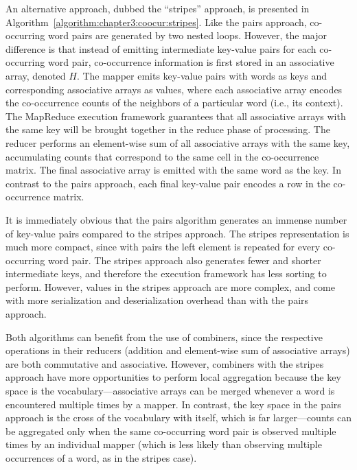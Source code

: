 \afterpage{\clearpage}

An alternative approach, dubbed the ``stripes'' approach, is presented
in Algorithm~\ref{algorithm:chapter3:coocur:stripes}.  Like the pairs
approach, co-occurring word pairs are generated by two nested loops.
However, the major difference is that instead of emitting intermediate
key-value pairs for each co-occurring word pair, co-occurrence
information is first stored in an associative array, denoted $H$.  The
mapper emits key-value pairs with words as keys and corresponding
associative arrays as values, where each associative array encodes the
co-occurrence counts of the neighbors of a particular word (i.e., its
context).  The MapReduce execution framework guarantees that all
associative arrays with the same key will be brought together in the
reduce phase of processing.  The reducer performs an element-wise sum
of all associative arrays with the same key, accumulating counts that
correspond to the same cell in the co-occurrence matrix.  The final
associative array is emitted with the same word as the key.  In
contrast to the pairs approach, each final key-value pair encodes a
row in the co-occurrence matrix.

It is immediately obvious that the pairs algorithm generates an
immense number of key-value pairs compared to the stripes approach.
The stripes representation is much more compact, since with pairs the
left element is repeated for every co-occurring word pair.  The
stripes approach also generates fewer and shorter intermediate keys,
and therefore the execution framework has less sorting to perform.
However, values in the stripes approach are more complex, and come
with more serialization and deserialization overhead than with the
pairs approach.

Both algorithms can benefit from the use of combiners, since the
respective operations in their reducers (addition and element-wise sum
of associative arrays) are both commutative and associative.  However,
combiners with the stripes approach have more opportunities to perform
local aggregation because the key space is the
vocabulary---associative arrays can be merged whenever a word is
encountered multiple times by a mapper.  In contrast, the key space in
the pairs approach is the cross of the vocabulary with itself, which
is far larger---counts can be aggregated only when the same
co-occurring word pair is observed multiple times by an individual
mapper (which is less likely than observing multiple occurrences of a
word, as in the stripes case).

